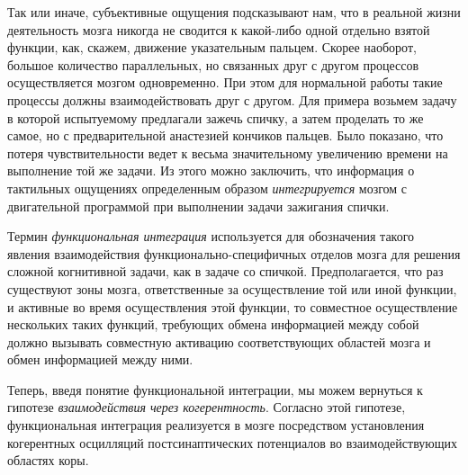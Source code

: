 Так или иначе, субъективные ощущения подсказывают нам, что в реальной жизни деятельность мозга никогда
не сводится к какой-либо одной отдельно взятой функции, как, скажем, движение указательным пальцем.
Скорее наоборот, большое количество параллельных, но связанных друг с другом процессов
осуществляется мозгом одновременно. При этом для нормальной работы такие процессы должны
взаимодействовать друг с другом.
Для примера возьмем задачу в которой испытуемому предлагали зажечь спичку, а затем проделать то же самое,
но с предварительной анастезией кончиков пальцев. Было показано, что потеря чувствительности
ведет к весьма значительному увеличению времени на выполнение той же задачи.
Из этого можно заключить, что информация о тактильных ощущениях определенным образом
\emph{интегрируется} мозгом с двигательной программой при выполнении задачи зажигания спички.

Термин \emph{функциональная интеграция} используется для обозначения такого явления взаимодействия
функционально-специфичных отделов мозга для решения сложной когнитивной задачи, как в задаче со спичкой.
Предполагается, что раз существуют зоны мозга, ответственные за осуществление той или иной функции,
и активные во время осуществления этой функции, то совместное осуществление нескольких таких функций,
требующих обмена информацией между собой должно вызывать совместную активацию соответствующих областей
мозга и обмен информацией между ними.

Теперь, введя понятие функциональной интеграции, мы можем вернуться к гипотезе \emph{взаимодействия
через когерентность}. Согласно этой гипотезе, функциональная интеграция реализуется в мозге посредством
установления когерентных осцилляций постсинаптических потенциалов во взаимодействующих областях коры.



